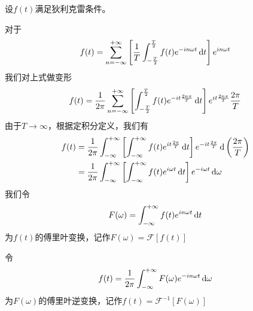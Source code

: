 \begin{prove}[傅里叶变换]
    设\(f(t)\)满足狄利克雷条件。\par
    对于
    \[
        f(t)=\sum_{n=-\infty}^{+\infty}\left[\frac{1}{T}\int^{\frac{T}{2}}_{-\frac{T}{2}} f(t)e^{-in\omega t}\dif t\right]e^{in\omega t}
    \]
    我们对上式做变形
    \[
        f(t)=\frac{1}{2\pi}\sum_{n=-\infty}^{+\infty}\left[\int^{\frac{T}{2}}_{-\frac{T}{2}} f(t)e^{-it\frac{2n\pi}{T}}\dif t\right]e^{it\frac{2n\pi}{T}}\frac{2\pi}{T}
    \]
    由于\(T\to \infty\)，根据定积分定义，我们有
    \[
        \begin{aligned}
            f(t) & =\frac{1}{2\pi}\int^{+\infty}_{-\infty}\left[\int^{+\infty}_{-\infty} f(t)e^{it\frac{2\pi}{T}}\dif t\right]e^{-it\frac{2\pi}{T}}\dif\left(\frac{2\pi}{T}\right) \\
                 & =\frac{1}{2\pi}\int^{+\infty}_{-\infty}\left[\int^{+\infty}_{-\infty} f(t)e^{i\omega t}\dif t\right]e^{-i\omega t}\dif\omega
        \end{aligned}
    \]
    我们令
    \[
        F(\omega)=\int^{+\infty}_{-\infty} f(t)e^{in\omega t}\dif t
    \]
    为\(f(t)\)的傅里叶变换，记作\(F(\omega)=\mathcal{F}[f(t)]\)\par
    令
    \[
        f(t)=\frac{1}{2\pi}\int^{+\infty}_{-\infty}F(\omega)e^{-in\omega t}\dif\omega
    \]
    为\(F(\omega)\)的傅里叶逆变换，记作\(f(t)=\mathcal{F}^{-1}[F(\omega)]\)\par
\end{prove}